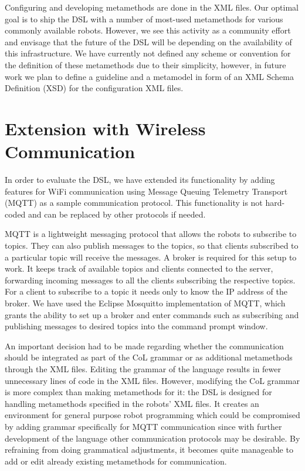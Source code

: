 \documentclass[runningheads]{llncs}
\begin{document}
Configuring and developing metamethods are done in the XML files. 
Our optimal goal is to ship the DSL with a number of most-used metamethods for various commonly available robots.
However, we see this activity as a community effort and envisage that the future of the DSL will be depending on the availability of this infrastructure.
We have currently not defined any scheme or convention for the definition of these metamethods due to their simplicity, however, in future work we plan to define a guideline and a metamodel in form of an XML Schema Definition (XSD) for the configuration XML files.

\section{Extension with Wireless Communication}

In order to evaluate the DSL, we have extended its functionality by adding features for WiFi communication using Message Queuing Telemetry Transport (MQTT) \cite{MQTT}  as a sample communication protocol. 
This functionality is not hard-coded and can be replaced by other protocols if needed. 

MQTT is a lightweight messaging protocol that allows the robots to subscribe to topics. 
They can also publish messages to the topics, so that clients subscribed to a particular topic will receive the messages. 
A broker is required for this setup to work. 
It keeps track of available topics and clients connected to the server, forwarding incoming messages to all the clients subscribing the respective topics.
For a client to subscribe to a topic it needs only to know the IP address of the broker.
We have used the Eclipse Mosquitto \cite{MOSQUITTO} implementation of MQTT, which grants the ability to set up a broker and enter commands such as subscribing and publishing messages to desired topics into the command prompt window.


An important decision had to be made regarding whether the communication should be integrated as part of the CoL grammar or as additional metamethods through the XML files. 
Editing the grammar of the language results in fewer unnecessary lines of code in the XML files.
However, modifying the CoL grammar is more complex than making metamethods for it: 
the DSL is designed for handling metamethods specified in the robots’ XML files.
It creates an environment for general purpose robot programming which could be compromised by adding grammar specifically for MQTT communication since with further development of the language other communication protocols may be desirable. 
By refraining from doing grammatical adjustments, it becomes quite manageable to add or edit already existing metamethods for communication.
\end{document}
